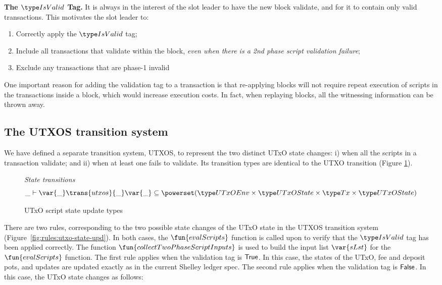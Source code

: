 \textbf{The $\IsValid$ Tag. }
It is always in the interest of the slot leader to have the new block validate,
and for it to contain only valid transactions. This motivates the
slot leader to:

\begin{enumerate}
  \item Correctly apply the $\IsValid$ tag;
  \item Include all transactions that validate within the block,
  \textit{even when there is a 2nd phase script validation failure};
  \item Exclude any transactions that are phase-1 invalid
\end{enumerate}

One important reason for adding the validation tag
to a transaction is that re-applying blocks will not require repeat
execution of scripts in the transactions inside a block, which would increase execution costs.
In fact, when replaying
blocks, all the witnessing information can be thrown away.

\subsection{The UTXOS transition system}
\label{sec:utxo-state-trans}

We have defined a separate transition system, UTXOS, to represent the two distinct
UTxO state changes: i) when all the scripts in a transaction validate; and
ii) when at least one fails to validate. Its transition types
are identical to the UTXO transition (Figure
\ref{fig:ts-types:utxo-scripts}).

\begin{figure}[htb]
  \emph{State transitions}
  \begin{equation*}
    \_ \vdash
    \var{\_} \trans{utxos}{\_} \var{\_}
    \subseteq \powerset (\UTxOEnv \times \UTxOState \times \Tx \times \UTxOState)
  \end{equation*}
  \caption{UTxO script state update types}
  \label{fig:ts-types:utxo-scripts}
\end{figure}

There are two rules, corresponding to the two possible state changes of the
UTxO state in the UTXOS transition system (Figure~\ref{fig:rules:utxo-state-upd}).
%
In both cases, the $\fun{evalScripts}$ function is called upon to verify that the $\IsValid$
tag has been applied correctly. The function $\fun{collectTwoPhaseScriptInputs}$ is used to build
the input list $\var{sLst}$ for the $\fun{evalScripts}$ function.
%
The first rule
applies when the validation tag is $\mathsf{True}$.
In this case, the states of the UTxO, fee
  and deposit pots, and updates are updated exactly as in the current Shelley
  ledger spec.
%
  The second rule
  applies when the validation tag is $\mathsf{False}$.
  In this case, the UTxO state changes as follows:

